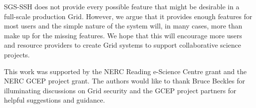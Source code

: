 \documentclass[times,10pt,twocolumn]{article}
\begin{document}
SGS-SSH does not provide every possible feature that might be desirable in a full-scale production Grid.  However, we argue that it provides enough features for most users and the simple nature of the system will, in many cases, more than make up for the missing features.  We hope that this will encourage more users and resource providers to create Grid systems to support collaborative science projects.

This work was supported by the NERC Reading e-Science Centre grant and the NERC GCEP project grant.  The authors would like to thank Bruce Beckles for illuminating discussions on Grid security and the GCEP project partners for helpful suggestions and guidance.



\end{document}
